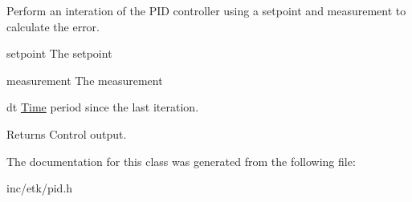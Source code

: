 Perform an interation of the P\-I\-D controller using a setpoint and measurement to calculate the error. 

\begin{DoxyItemize}
\item setpoint The setpoint \item measurement The measurement \item dt \hyperlink{classetk_1_1_time}{Time} period since the last iteration. \begin{DoxyReturn}{Returns}
Control output. 
\end{DoxyReturn}
\end{DoxyItemize}


The documentation for this class was generated from the following file\-:\begin{DoxyCompactItemize}
\item 
inc/etk/pid.\-h\end{DoxyCompactItemize}
